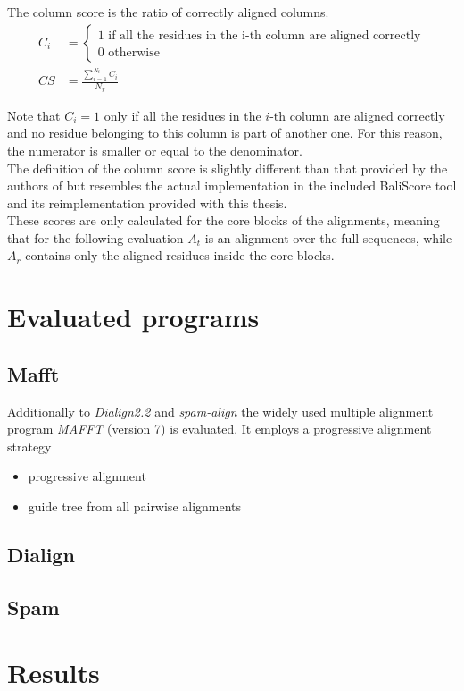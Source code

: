 \begin{mydef}
	The column score is the ratio of correctly aligned columns. 
	\begin{align*}
	C_i &= \begin{cases}
	1 \text{ if all the residues in the i-th column are aligned correctly}\\
	0 \text{ otherwise}
	\end{cases} \\
	CS &= \frac{\sum_{i=1}^{N_t} C_i}{N_r}
	\end{align*}
\end{mydef}
Note that $C_i = 1$ only if all the residues in the $i$-th column are aligned correctly and no residue belonging to this column is part of another one. For this reason, the numerator is smaller or equal to the denominator.\\
The definition of the column score is slightly different than that provided by the authors of \bb \cite{thompson1999comprehensive} but resembles the actual implementation in the included BaliScore tool and its reimplementation provided with this thesis.\\
These scores are only calculated for the core blocks of the \bb alignments, meaning that for the following evaluation $A_t$ is an alignment over the full sequences, while $A_r$ contains only the aligned residues inside the core blocks.

\section{Evaluated programs}


\subsection{Mafft}
Additionally to \textit{Dialign2.2} and \textit{spam-align} the widely used multiple alignment program \textit{MAFFT} (version 7) is evaluated. It employs a progressive alignment strategy 

\begin{itemize}
	\item progressive alignment
	\item guide tree from all pairwise alignments
\end{itemize}

\subsection{Dialign}

\subsection{Spam}

\section{Results}
